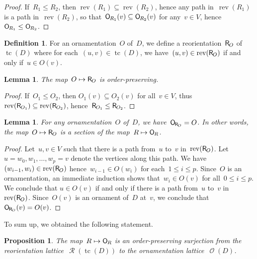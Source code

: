 \documentclass{amsart}
\newtheorem{proposition}[theorem]{Proposition}
\newtheorem{lemma}[theorem]{Lemma}
\theoremstyle{definition}
\newtheorem{definition}[theorem]{Definition}
\renewcommand{\c}[1]{\mathcal{#1}} %
\DeclareMathOperator{\tc}{tc} %
\newcommand{\vincent}[1]{\todo[size=\tiny,color=blue!30]{ #1 \\ \hfill --- V.}\,}
\newcommand{\mymap}[2]{\mathsf{#1}_{\hspace{-.7pt}#2}}
\DeclareMathOperator{\Orn}{\c{O}}  %
\newcommand{\orn}[1]{\mymap{O}{#1}}  %
\DeclareMathOperator{\Reori}{\c{R}}  %
\newcommand{\reori}[1]{\mymap{R}{#1}}  %
\DeclareMathOperator{\rev}{rev} %
\begin{document}
\begin{proof}
If~$R_1 \le R_2$, then $\rev(R_1) \subseteq \rev(R_2)$, hence any path in~$\rev(R_1)$ is a path in~$\rev(R_2)$, so that~$\orn{R_1}(v) \subseteq \orn{R_2}(v)$ for any~$v \in V$, hence~$\orn{R_1} \le \orn{R_2}$.
\end{proof}

\begin{definition}
\label{def:Orn2Reori}
For an ornamentation~$O$ of~$D$, we define a reorientation~$\reori{O}$ of~$\tc(D)$ where for each~$(u,v) \in \tc(D)$, we have~$(u,v) \in \rev(\reori{O})$ if and only if~$u \in O(v)$.
\end{definition}

\begin{lemma}
\label{lem:Orn2Reori1}
The map~$O \mapsto \reori{O}$ is order-preserving.
\end{lemma}

\begin{proof}
If~$O_1 \le O_2$, then $O_1(v) \subseteq O_2(v)$ for all~$v \in V$, thus~$\rev(\reori{O_1}) \subseteq \rev(\reori{O_2})$, hence~${\reori{O_1} \le \reori{O_2}}$.
\end{proof}

\begin{lemma}
\label{lem:Orn2Reori2}
For any ornamentation~$O$ of~$D$, we have~$\orn{\reori{O}} = O$. In other words, the map~${O \mapsto \reori{O}}$ is a section of the map~$R \mapsto \orn{R}$.
\end{lemma}

\begin{proof}
Let~$u,v \in V$ such that there is a path from~$u$ to~$v$ in~$\rev(\reori{O})$.
Let~$u = w_0, w_1, \dots, w_p = v$ denote the vertices along this path.
We have~$(w_{i-1},w_i) \in \rev(\reori{O})$ hence~$w_{i-1} \in O(w_i)$ for each~$1 \le i \le p$.
Since~$O$ is an ornamentation, an immediate induction shows that~$w_i \in O(v)$ for all~$0 \le i \le p$.
We conclude that $u \in O(v)$ if and only if there is a path from~$u$ to~$v$ in~$\rev(\reori{O})$.
Since~$O(v)$ is an ornament of~$D$ at~$v$, we conclude that~$\orn{\reori{O}}(v) = O(v)$.
\end{proof}

To sum up, we obtained the following statement.

\begin{proposition}
\label{prop:Reori2Orn}
The map~$R \mapsto \orn{R}$ is an order-preserving surjection from the reorientation lattice~$\Reori(\tc(D))$ to the ornamentation lattice~$\Orn(D)$.
\end{proposition}
\end{document}
